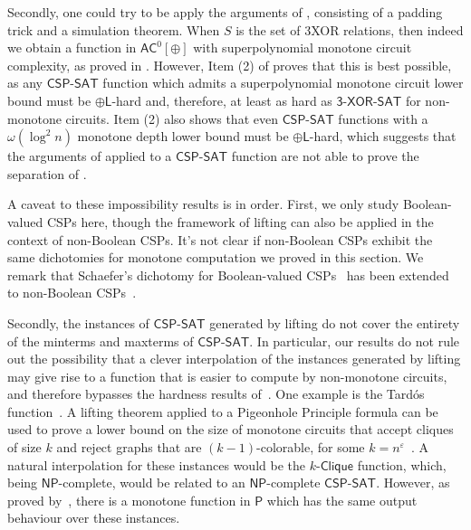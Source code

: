 \documentclass[10pt,a4paper]{article}
\newcommand{\eps}{\varepsilon}
\newcommand{\complexityfont}[1]{\mathsf{#1}}
\def\P            {\complexityfont{P}}
\def\NP           {\complexityfont{NP}}
\def\AC           {\complexityfont{AC}}
\def\pL           {\oplus\complexityfont{L}}
\newcommand{\txorsat}{\mathsf{3\mbox{-}XOR\mbox{-}SAT}}
\newcommand{\clique}{\mathsf{Clique}}
\newcommand{\kclq}{k\mbox{-}\!\clique}
\newcommand{\xor}{\oplus}
\newcommand{\CSPSAT}{\mathsf{CSP}\text{-}\mathsf{SAT}}
\begin{document}
Secondly, one could try to be apply the arguments of
,
consisting of a padding trick and a simulation
theorem.
When $S$ is the set of 3XOR relations,
then indeed we obtain a function in $\AC^0[\xor]$ with superpolynomial
monotone circuit complexity,
as proved in .
However, 
Item (2) of 
proves that this is best possible,
as any $\CSPSAT$ function which admits a superpolynomial monotone circuit
lower bound must be $\pL$-hard and, therefore,
at least as hard as $\txorsat$ for non-monotone circuits.
Item (2) also shows that even $\CSPSAT$ functions with a $\omega(\log^2 n)$
monotone depth lower bound must be $\pL$-hard,
which suggests that the arguments of
 applied to a $\CSPSAT$ function
are not able to prove the separation of .

A caveat to these impossibility results is in order.
First, 
we only study Boolean-valued CSPs here,
though the framework of lifting can also be applied in the context of
non-Boolean CSPs.
It's not clear if non-Boolean CSPs exhibit the same dichotomies
for monotone computation
we proved in this section.
We remark that Schaefer's dichotomy for Boolean-valued CSPs~\cite{DBLP:conf/stoc/Schaefer78}
has been extended to non-Boolean
CSPs~\cite{DBLP:conf/focs/Zhuk17,DBLP:conf/focs/Bulatov17}.

Secondly,
the instances of $\CSPSAT$ generated by lifting
do not cover the entirety of the minterms and maxterms of $\CSPSAT$.
In particular, our results do not rule out the possibility
that a clever interpolation of the instances generated by lifting
may give rise to a function that is easier to compute by non-monotone
circuits,
and therefore bypasses the hardness results of~.
One example is the Tardós function~\cite{tardos_1988}.
A lifting theorem applied to a Pigeonhole Principle formula can be used to prove 
a lower bound on the size of monotone circuits that accept cliques of size
$k$ and reject graphs that are $(k-1)$-colorable, for some $k = n^\eps$~\cite{DBLP:journals/combinatorica/RazM99,susanna_2023}.
A natural interpolation for these instances would be the $\kclq$
function, which, being $\NP$-complete, would be related to an $\NP$-complete
$\CSPSAT$.
However, as proved by~\cite{tardos_1988}, there is a monotone function
in
$\P$ which has the same output behaviour over these instances. 
\end{document}
